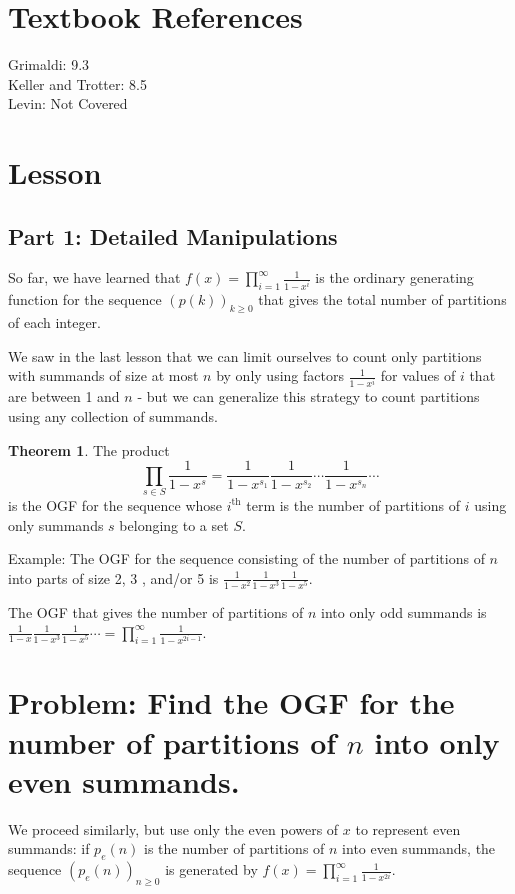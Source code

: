\documentclass{article}
\theoremstyle{definition}
\newtheorem{theorem}{Theorem}
\begin{document}
\section*{Textbook References}
Grimaldi: 9.3\\
Keller and Trotter: 8.5\\
Levin: Not Covered

\section*{Lesson}
\subsection*{Part 1: Detailed Manipulations}
So far, we have learned that $f(x)=\prod_{i=1}^{\infty} \frac{1}{1-x^{i}}$ is the ordinary generating function for the sequence $(p(k))_{k \geq 0}$ that gives the total number of partitions of each integer.

We saw in the last lesson that we can limit ourselves to count only partitions with summands of size at most $n$ by only using factors $\frac{1}{1-x^{i}}$ for values of $i$ that are between 1 and $n$ - but we can generalize this strategy to count partitions using any collection of summands.

\begin{theorem}
The product
\[\prod_{s \in S} \frac{1}{1-x^{s}}=\frac{1}{1-x^{s_{1}}} \frac{1}{1-x^{s_{2}}} \cdots \frac{1}{1-x^{s_{n}}} \cdots\]
is the OGF for the sequence whose $i^{\text{th}}$ term is the number of partitions of $i$ using only summands $s$ belonging to a set $S$.
\end{theorem}

Example: The OGF for the sequence consisting of the number of partitions of $n$ into parts of size 2, 3 , and/or 5 is $\frac{1}{1-x^{2}} \frac{1}{1-x^{3}} \frac{1}{1-x^{5}}$.

The OGF that gives the number of partitions of $n$ into only odd summands is $\frac{1}{1-x} \frac{1}{1-x^{3}} \frac{1}{1-x^{5}} \cdots=\prod_{i=1}^{\infty} \frac{1}{1-x^{2 i-1}}$.

\section*{Problem: Find the OGF for the number of partitions of $n$ into only even summands.}
We proceed similarly, but use only the even powers of $x$ to represent even summands: if $p_{e}(n)$ is the number of partitions of $n$ into even summands, the sequence $\left(p_{e}(n)\right)_{n \geq 0}$ is generated by $f(x)=\prod_{i=1}^{\infty} \frac{1}{1-x^{2 i}}$.
\end{document}
